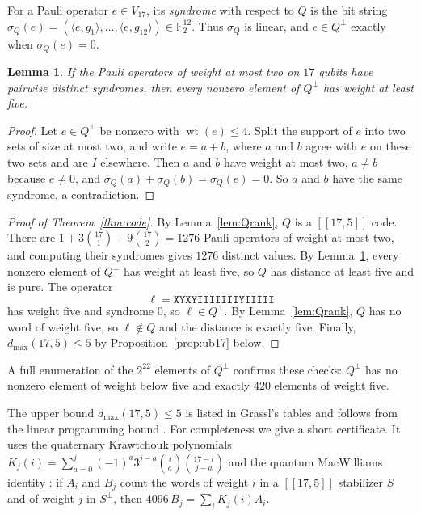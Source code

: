 \documentclass[11pt]{article}
\newtheorem{lemma}[theorem]{Lemma}
\theoremstyle{definition}
\theoremstyle{remark}
\newcommand{\F}{\mathbb F_2}
\newcommand{\qc}[1]{[\![#1]\!]}
\newcommand{\wt}{\operatorname{wt}}
\begin{document}
For a Pauli operator \(e\in V_{17}\), its \emph{syndrome} with respect to
\(Q\) is the bit string
\(\sigma_Q(e)=(\langle e,g_1\rangle,\ldots,\langle e,g_{12}\rangle)\in\F^{12}\).
Thus \(\sigma_Q\) is linear, and \(e\in Q^\perp\) exactly when
\(\sigma_Q(e)=0\).

\begin{lemma}\label{lem:radius2}
If the Pauli operators of weight at most two on \(17\) qubits have
pairwise distinct syndromes, then every nonzero element of \(Q^\perp\)
has weight at least five.
\end{lemma}
\begin{proof}
Let \(e\in Q^\perp\) be nonzero with \(\wt(e)\leq4\). Split the support
of \(e\) into two sets of size at most two, and write \(e=a+b\), where
\(a\) and \(b\) agree with \(e\) on these two sets and are \(I\)
elsewhere. Then \(a\) and \(b\) have weight at most two, \(a\neq b\)
because \(e\neq0\), and \(\sigma_Q(a)+\sigma_Q(b)=\sigma_Q(e)=0\). So
\(a\) and \(b\) have the same syndrome, a contradiction.
\end{proof}

\begin{proof}[Proof of Theorem~\ref{thm:code}]
By Lemma~\ref{lem:Qrank}, \(Q\) is a \(\qc{17,5}\) code. There are
\(1+3\binom{17}{1}+9\binom{17}{2}=1276\) Pauli operators of weight at
most two, and computing their syndromes gives \(1276\) distinct values.
By Lemma~\ref{lem:radius2}, every nonzero element of \(Q^\perp\) has
weight at least five, so \(Q\) has distance at least five and is pure.
The operator
\[
 \ell=\texttt{XYXYIIIIIIIYIIIII}
\]
has weight five and syndrome \(0\), so \(\ell\in Q^\perp\). By
Lemma~\ref{lem:Qrank}, \(Q\) has no word of weight five, so
\(\ell\notin Q\) and the distance is exactly five. Finally,
\(d_{\max}(17,5)\leq5\) by Proposition~\ref{prop:ub17} below.
\end{proof}

A full enumeration of the \(2^{22}\) elements of \(Q^\perp\) confirms
these checks: \(Q^\perp\) has no nonzero element of weight below five
and exactly \(420\) elements of weight five.

The upper bound \(d_{\max}(17,5)\leq5\) is listed in Grassl's tables
and follows from the linear programming bound
\cite{rains98,ashikhmin}. For completeness we give a short certificate. It uses the quaternary
Krawtchouk polynomials
\(K_j(i)=\sum_{a=0}^{j}(-1)^a3^{j-a}\binom{i}{a}\binom{17-i}{j-a}\) and
the quantum MacWilliams identity \cite{shorlaflamme,rains98}: if \(A_i\) and \(B_j\) count
the words of weight \(i\) in a \(\qc{17,5}\) stabilizer \(S\) and of
weight \(j\) in \(S^\perp\), then
\(4096\,B_j=\sum_{i}K_j(i)A_i\).
\end{document}
